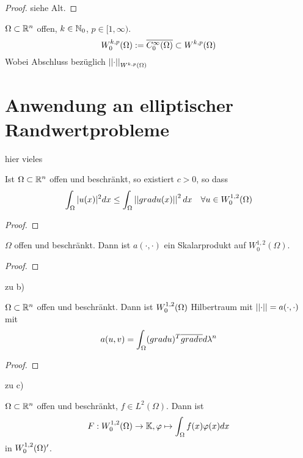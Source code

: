 \documentclass[ngerman]{report}
\begin{document}
	\begin{proof}
		siehe Alt.
	\end{proof}

	\begin{definition}[$W^{k,p}_0(\Omega)$]
		$\Omega \subset \mathbb{R}^n$ offen, $k\in \mathbb{N}_0$, $p\in [1,\infty)$.
			$$ W^{k,p}_0(\Omega) := \overline{C^\infty_0(\Omega)}\subset W^{k,p}(\Omega)$$ 
			Wobei Abschluss bezüglich $\left\lvert \left\lvert \cdot \right\rvert \right\rvert_{W^{k,p}(\Omega)}$
	\end{definition}
	\section*{Anwendung an elliptischer Randwertprobleme}
	 hier vieles 
	\begin{lemma}
		Ist $\Omega \subset \mathbb{R}^n$ offen und beschränkt, so existiert $c > 0$, so dass
			$$ \int_\Omega |u(x)|^2 dx \leq \int_\Omega \left\lvert \left\lvert grad u(x) \right\rvert \right\rvert^2dx \quad \forall u\in W_0^{1,2}(\Omega)$$
	\end{lemma}
	
	\begin{proof}
		\todor
	\end{proof}

	\begin{thm}
		$\Omega$ offen und beschränkt. Dann ist $a(\cdot,\cdot)$ ein Skalarprodukt auf $W_0^{1,2}(\Omega).$
	\end{thm}

	\begin{proof}
	\todor
	\end{proof}
zu b)
	\begin{thm}
		$\Omega \subset \mathbb{R}^n$ offen und beschränkt. Dann ist $W^{1,2}_0(\Omega)$ Hilbertraum mit $\left\lvert \left\lvert \cdot \right\rvert \right\rvert = a(\cdot,\cdot)$ mit 
		$$a(u,v) = \int_\Omega(grad u)^T \overline{grad v} d\lambda^n$$
	\end{thm}

	\begin{proof}
		\todor	
	\end{proof}

zu c)
	\begin{thm}
		$\Omega \subset \mathbb{R}^n$ offen und beschränkt, $f\in L^2(\Omega)$. Dann ist 
			$$ F: W^{1,2}_0(\Omega) \to \mathbb{K}, \varphi \mapsto \int_\Omega f(x) \varphi(x) dx$$
		in $W^{1,2}_0(\Omega)'$.
	\end{thm}
\end{document}
